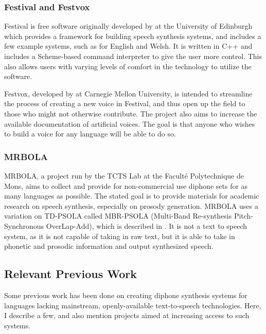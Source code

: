 \documentclass[12pt]{article}
\begin{document}
		\subsubsection{Festival and Festvox}
		Festival is free software originally developed by \citet{festival} at the University of Edinburgh which provides a framework for building speech synthesis systems, and includes a few example systems, such as for English and Welsh. It is written in C++ and includes a Scheme-based command interpreter to give the user more control. This also allows users with varying levels of comfort in the technology to utilize the software. \par

		Festvox, developed by \citet{festvox} at Carnegie Mellon University, is intended to streamline the process of creating a new voice in Festival, and thus open up the field to those who might not otherwise contribute. The project also aims to increase the available documentation of artificial voices. The goal is that anyone who wishes to build a voice for any language will be able to do so. \par

		\subsubsection{MRBOLA}
		MRBOLA, a project run by the TCTS Lab at the Facult\'e Polytechnique de Mons, aims to collect and provide for non-commercial use diphone sets for as many languages as possible. The stated goal is to provide materials for academic research on speech synthesis, especially on prosody generation. MRBOLA uses a variation on TD-PSOLA called MBR-PSOLA (Multi-Band Re-synthesis Pitch-Synchronous OverLap-Add), which is described in \citet{four_cand}. It is not a text to speech system, as it is not capable of taking in raw text, but it is able to take in phonetic and prosodic information and output synthesized speech. \par

	\subsection{Relevant Previous Work}

		Some previous work has been done on creating diphone synthesis systems for languages lacking mainstream, openly-available text-to-speech technologies. Here, I describe a few, and also mention projects aimed at increasing access to such systems. \par
\end{document}
